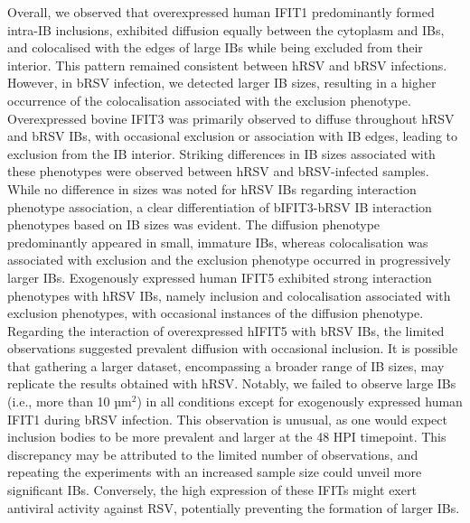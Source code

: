 Overall, we observed that overexpressed human IFIT1 predominantly formed intra-IB inclusions, exhibited diffusion equally between the cytoplasm and IBs, and colocalised with the edges of large IBs while being excluded from their interior. This pattern remained consistent between hRSV and bRSV infections. However, in bRSV infection, we detected larger IB sizes, resulting in a higher occurrence of the colocalisation associated with the exclusion phenotype. Overexpressed bovine IFIT3 was primarily observed to diffuse throughout hRSV and bRSV IBs, with occasional exclusion or association with IB edges, leading to exclusion from the IB interior. Striking differences in IB sizes associated with these phenotypes were observed between hRSV and bRSV-infected samples. While no difference in sizes was noted for hRSV IBs regarding interaction phenotype association, a clear differentiation of bIFIT3-bRSV IB interaction phenotypes based on IB sizes was evident. The diffusion phenotype predominantly appeared in small, immature IBs, whereas colocalisation was associated with exclusion and the exclusion phenotype occurred in progressively larger IBs. Exogenously expressed human IFIT5 exhibited strong interaction phenotypes with hRSV IBs, namely inclusion and colocalisation associated with exclusion phenotypes, with occasional instances of the diffusion phenotype. Regarding the interaction of overexpressed hIFIT5 with bRSV IBs, the limited observations suggested prevalent diffusion with occasional inclusion. It is possible that gathering a larger dataset, encompassing a broader range of IB sizes, may replicate the results obtained with hRSV. Notably, we failed to observe large IBs (i.e., more than 10 \(\mbox{µm}^2\)) in all conditions except for exogenously expressed human IFIT1 during bRSV infection. This observation is unusual, as one would expect inclusion bodies to be more prevalent and larger at the 48 HPI timepoint. This discrepancy may be attributed to the limited number of observations, and repeating the experiments with an increased sample size could unveil more significant IBs. Conversely, the high expression of these IFITs might exert antiviral activity against RSV, potentially preventing the formation of larger IBs.